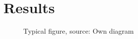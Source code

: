 \chapter{Results}
\label{ch:results}

\begin{figure}[ht]
	\centering
	\caption{Typical figure, source: Own diagram}
	\label{fig:1}
\end{figure}
